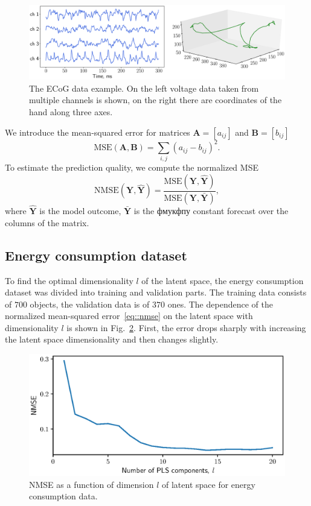 \documentclass[12pt,twoside]{article}
\newcommand{\bY}{\mathbf{Y}}
\begin{document}
\begin{figure}
	\includegraphics[width=\linewidth]{figs/ecog_data.eps}
	\caption{The ECoG data example. On the left voltage data taken from multiple channels is shown, on the right there are coordinates of the hand along three axes.}
	\label{fig::ecog_data}
\end{figure}

We introduce the mean-squared error for matrices $\mathbf{A} = [a_{ij}]$ and $\mathbf{B} = [b_{ij}]$ 
\[
\text{MSE} (\mathbf{A}, \mathbf{B}) = \sum_{i,j} (a_{ij} - b_{ij})^2.
\]
To estimate the prediction quality, we compute the normalized MSE 
\begin{equation}
\text{NMSE}(\bY,  \mathbf{\hat{Y}}) = \frac{\text{MSE} (\bY, \mathbf{\hat{Y}})}{\text{MSE} (\bY, \mathbf{\bar{Y}})},
\label{eq::nmse}
\end{equation}
where $\mathbf{\hat{Y}}$ is the model outcome, $\mathbf{\bar{Y}}$ is the фмукфпу constant forecast over the columns of the matrix.

\subsection{Energy consumption dataset}

To find the optimal dimensionality $l$ of the latent space, the energy consumption dataset was divided into training and validation parts. 
The training data consists of $700$ objects, the validation data is of $370$ ones. The dependence of the normalized mean-squared error~\eqref{eq::nmse} on the latent space with dimensionality $l$ is shown in Fig.~\ref{fig::energy_n_comp}. 
First, the error drops sharply with increasing the latent space dimensionality and then changes slightly.

\begin{figure}[!h]
	\centering
	\includegraphics[width=0.75\linewidth]{figs/energy_n_comp}
	\caption{NMSE as a function of dimension $l$ of latent space for energy consumption data.}
	\label{fig::energy_n_comp}
\end{figure}
\end{document}
